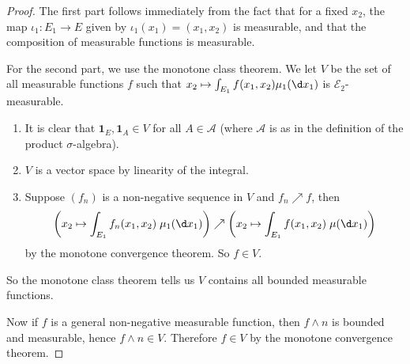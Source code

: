 \documentclass[a4paper]{article}
\begin{document}
\begin{proof}
%
%
  The first part follows immediately from the fact that for a fixed $x_2$, the map $\iota_1: E_1 \to E$ given by $\iota_1(x_1) = (x_1, x_2)$ is measurable, and that the composition of measurable functions is measurable.

  For the second part, we use the monotone class theorem. We let $V$ be the set of all measurable functions $f$ such that $x_2 \mapsto \int_{E_1} f(x_1, x_2) \mu_1(\d x_1)$ is $\mathcal{E}_2$-measurable.
  \begin{enumerate}
    \item It is clear that $\mathbf{1}_E, \mathbf{1}_A \in V$ for all $A \in \mathcal{A}$ (where $\mathcal{A}$ is as in the definition of the product $\sigma$-algebra).
    \item $V$ is a vector space by linearity of the integral.
    \item Suppose $(f_n)$ is a non-negative sequence in $V$ and $f_n \nearrow f$, then
      \[
        \left(x_2 \mapsto \int_{E_1} f_n(x_1, x_2)\; \mu_1(\d x_1)\right) \nearrow \left(x_2 \mapsto \int_{E_1} f(x_1, x_2)\;\mu(\d x_1)\right)
      \]
      by the monotone convergence theorem. So $f \in V$.
  \end{enumerate}
  So the monotone class theorem tells us $V$ contains all bounded measurable functions.

  Now if $f$ is a general non-negative measurable function, then $f \wedge n$ is bounded and measurable, hence $f\wedge n \in V$. Therefore $f \in V$ by the monotone convergence theorem.
\end{proof}
\end{document}
